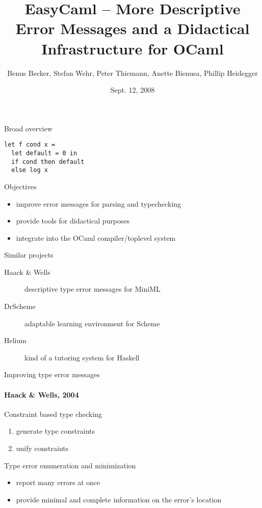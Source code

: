 \documentclass{beamer}
\title[EasyCaml -- More Descriptive Error Messages for OCaml]{EasyCaml -- More Descriptive Error Messages and a Didactical Infrastructure for OCaml}
\author[Benus Becker]{Benus Becker, Stefan Wehr, Peter Thiemann, Anette Bienusa, Phillip Heidegger}
\institute[OCaml Summer Project '08]{OCaml Summer Project, 2008. Jane St.\ Capital}
\date{Sept. 12, 2008}
\begin{document}
\frame{\titlepage}

\begin{frame}[fragile]{Broad overview}

\begin{verbatim}
let f cond x =
  let default = 0 in
  if cond then default
  else log x
\end{verbatim}

  Objectives
  \begin{itemize}
    \item improve error messages for parsing and typechecking
    \item provide tools for didactical purposes
    \item integrate into the OCaml compiler/toplevel system
  \end{itemize}

  Similar projects
  \begin{description}
    \item[Haack \& Wells] descriptive type error messages for MiniML
    \item[DrScheme] adaptable learning environment for Scheme
    \item[Helium] kind of a tutoring system for Haskell
  \end{description}
\end{frame}

\begin{frame} {Improving type error messages}
  \framesubtitle{Haack \& Wells, 2004}

  Constraint based type checking
  \begin{enumerate}
    \item generate type constraints 
    \item unify constraints
  \end{enumerate}

  Type error enumeration and minimization 
  \begin{itemize}
    \item report many errors at once
    \item provide minimal and complete information on the error's location
  \end{itemize}

\end{frame}
\end{document}
